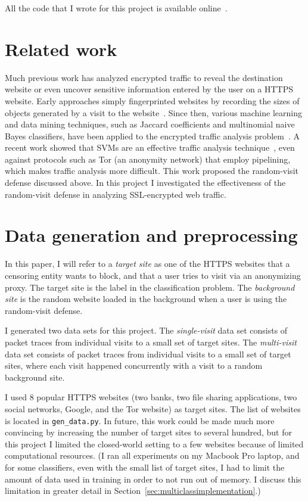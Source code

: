 \documentclass[10pt, twocolumn]{article}
\begin{document}
All the code that I wrote for this project is available online~\cite{github}.

\section{Related work}

Much previous work has analyzed encrypted traffic to reveal the destination website or 
even uncover sensitive information entered by the user on a HTTPS website. Early
approaches simply fingerprinted websites by recording the sizes of objects generated 
by a visit to the website~\cite{safeweb}. Since then, various machine learning 
and data mining techniques, such as Jaccard coefficients and multinomial naive Bayes classifiers,
have been applied to the encrypted traffic analysis problem~\cite{herrmann,liberatore}. 
A recent work showed that SVMs are an effective traffic analysis technique~\cite{torfingerprinting}, even 
against protocols such as Tor (an anonymity network) that employ pipelining, which makes 
traffic analysis more difficult. This work proposed the random-visit defense discussed above. In 
this project I investigated the effectiveness of the random-visit defense in analyzing 
SSL-encrypted web traffic.

\section{Data generation and preprocessing}
\label{sec:data}

In this paper, I will refer to a \textit{target site} as one of the HTTPS websites that a censoring 
entity wants to block, and that a user tries to visit via an anonymizing proxy.
 The target site is the label in the classification 
problem. The \textit{background site} is the random website loaded in the background when a 
user is using the random-visit defense.

I generated two data sets for this project. The \textit{single-visit} data set consists of packet 
traces from individual visits to a small set of target sites. The \textit{multi-visit} data set 
consists of packet traces from individual visits to a small set of target sites, where each visit 
happened concurrently with a visit to a random background site.

I used 8 popular HTTPS websites (two banks, two file sharing applications, two social networks, 
Google, and the Tor website) as target sites. The list of websites is located in \texttt{gen\_data.py}.
In future, this work could be made much more convincing by increasing the number of target sites 
to several hundred, but for this project I limited the closed-world setting to a few websites 
because of limited computational resources. (I ran all experiments on my Macbook Pro laptop, and 
for some classifiers, even with the small list of target sites, I had to limit the amount of data 
used in training in order to not run out of memory. I discuss this limitation in greater detail 
in Section~\ref{sec:multiclassimplementation}.)
\end{document}
